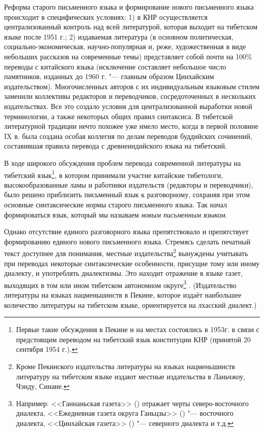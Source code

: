 Реформа старого письменного языка и формирование нового письменного языка происходит в специфических условиях: 1) в КНР осуществляется централизованный контроль над всей литературой, которая выходит на тибетском языке после 1951 г.; 2) издаваемая литература (в основном политическая, социально-экономическая, научно-популярная и, реже, художественная в виде небольших рассказов на современные темы) представляет собой почти на 100\% переводы с китайского языка (исключение составляет небольшое число памятников, изданных до 1960 г. "--- главным образом Цинхайским издательством). Многочисленных авторов с их индивидуальным языковым стилем заменили коллективы редакторов и переводчиков, сосредоточенных в нескольких издательствах. Все это создало условия для централизованной выработки новой терминологии, а также некоторых общих правил синтаксиса. В тибетской литературной традиции нечто похожее уже имело место, когда в первой половине IX в. была создана особая коллегия по делам переводов буддийских сочинений, составившая правила перевода с древнеиндийского языка на тибетский.

В ходе широкого обсуждения проблем перевода современной литературы на тибетский язык\footnote[6]{Первые такие обсуждения в Пекине и на местах состоялись в 1953г. в связи с предстоящим переводом на тибетский язык конституции КНР (принятой 20 сентября 1954 г.).}, в котором принимали участие китайские тибетологи, высокообразованные ламы и работники издательств (редакторы и переводчики), было решено приблизить письменный язык к разговорному, сохраняя при этом основные синтаксические нормы старого письменного языка. Так начал формироваться язык, который мы называем \emph{новым письменным языком}.

Однако отсутствие единого разговорного языка препятствовало и препятствует формированию единого нового письменного языка. Стремясь сделать печатный текст доступнее для понимания, местные издательства\footnote[7]{Кроме Пекинского издательства литературы на языках нацменьшинств литературу на тибетском языке издают местные издательства в Ланьчжоу, Чэнду, Синане.} вынуждены учитывать при переводах некоторые синтаксические особенности, присущие тому или иному диалекту, и употреблять диалектизмы. Это находит отражение в языке газет, выходящих в том или ином тибетском автономном округе\footnote[8]{Например: <<Ганнаньская газета>> () отражает черты северо-восточного диалекта, <<Ежедневная газета округа Ганьцзы>> () "--- восточного диалекта, <<Цинхайская газета>> () "--- северного диалекта и т.д.} . (Издательство литературы на языках нацменьшинств в Пекине, которое издаёт наибольшее количество литературы на тибетском языке, ориентируется на лхасский диалект.)

